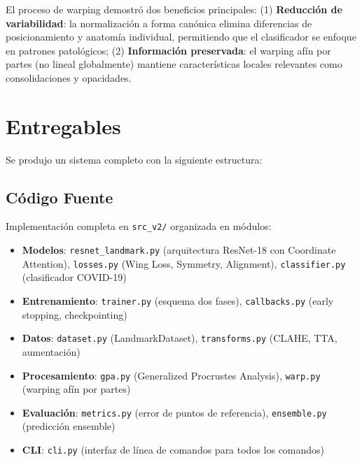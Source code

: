 \documentclass[12pt,a4paper]{article}
\newcommand{\code}[1]{\texttt{#1}}
\begin{document}
El proceso de warping demostró dos beneficios principales: (1) \textbf{Reducción de variabilidad}: la normalización a forma canónica elimina diferencias de posicionamiento y anatomía individual, permitiendo que el clasificador se enfoque en patrones patológicos; (2) \textbf{Información preservada}: el warping afín por partes (no lineal globalmente) mantiene características locales relevantes como consolidaciones y opacidades.

\section{Entregables}

Se produjo un sistema completo con la siguiente estructura:

\subsection{Código Fuente}

Implementación completa en \code{src\_v2/} organizada en módulos:

\begin{itemize}[itemsep=2pt]
    \item \textbf{Modelos}: \code{resnet\_landmark.py} (arquitectura ResNet-18 con Coordinate Attention), \code{losses.py} (Wing Loss, Symmetry, Alignment), \code{classifier.py} (clasificador COVID-19)
    \item \textbf{Entrenamiento}: \code{trainer.py} (esquema dos fases), \code{callbacks.py} (early stopping, checkpointing)
    \item \textbf{Datos}: \code{dataset.py} (LandmarkDataset), \code{transforms.py} (CLAHE, TTA, aumentación)
    \item \textbf{Procesamiento}: \code{gpa.py} (Generalized Procrustes Analysis), \code{warp.py} (warping afín por partes)
    \item \textbf{Evaluación}: \code{metrics.py} (error de puntos de referencia), \code{ensemble.py} (predicción ensemble)
    \item \textbf{CLI}: \code{cli.py} (interfaz de línea de comandos para todos los comandos)
\end{itemize}

\end{document}
